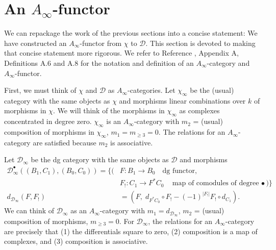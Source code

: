 \section{An $A_\infty$-functor}
We can repackage the work of the previous 
sections into a concise statement: We have 
constructed an $A_\infty$-functor from 
$\chi$ to $\mathcal{D}$. This section is 
devoted to making that concise statement 
more rigorous. We refer to Reference 
\cite{F}, Appendix A, Definitions 
A.6 and A.8 for the notation and 
definition of an 
$A_\infty$-category and  
$A_\infty$-functor.

First, we must think of $\chi$ and 
$\mathcal{D}$ as $A_\infty$-categories. 
Let $\chi_\infty$ be the (usual) category 
with the same objects as $\chi$ and 
morphisms linear combinations over $k$ 
of morphisms in $\chi$. We will think of 
the morphisms in $\chi_\infty$ as 
complexes concentrated in degree zero. 
$\chi_\infty$ is an $A_\infty$-category 
with $m_2$ = (usual) composition of 
morphisms in $\chi_\infty$, $m_1 = 
m_{\geq 3} = 0$. The relations for an 
$A_\infty$-category are satisfied 
because $m_2$ is associative.

Let $\mathcal{D}_\infty$ be the 
dg category with the same objects 
as $\mathcal{D}$ and morphisms
\begin{align*}
\mathcal{D}_\infty^\bullet((B_1, C_1), (B_0,C_0))
= \big\{ \big(
& F: 
B_1 \to B_0 \quad \textrm{dg functor},\\
& F_!:
C_1 \to F^*C_0 \quad \textrm{map of 
comodules of degree $\bullet$}
\big) \big\}\\
d_{\mathcal{D}_\infty}(F,F_!)
&=
(F,\; d_{F^*C_0} \circ F_! - (-1)^{|F_!|} 
F_! \circ d_{C_1}).
\end{align*}
We can think of $\mathcal{D}_\infty$ 
as an $A_\infty$-category with $m_1 = 
d_{\mathcal{D}_\infty}$, $m_2$ = (usual) 
composition of morphisms, $m_{\geq 3} = 0$. 
For $\mathcal{D}_\infty$, the relations for an 
$A_\infty$-category are precisely that 
(1) the differentials square to zero, 
(2) composition is a map of 
complexes, and (3) composition is 
associative.


